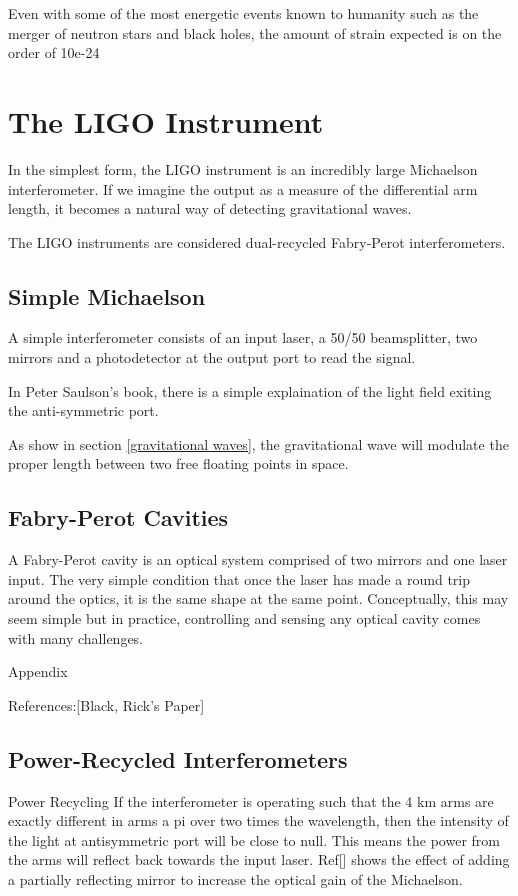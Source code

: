 \documentclass[oneside]{book}
\begin{document}
	Even with some of the most energetic events known to humanity such as the merger of neutron stars and black holes, the amount of strain expected is on the order of 10e-24
	
	\cite{Saulson}
	
	
	\section{The LIGO Instrument}
	In the simplest form, the LIGO instrument is an incredibly large Michaelson interferometer.  If we imagine the output as a measure of the differential arm length, it becomes a natural way of detecting gravitational waves.
	
	The LIGO instruments are considered dual-recycled Fabry-Perot interferometers.
	
		\subsection{Simple Michaelson}
		A simple interferometer consists of an input laser, a 50/50 beamsplitter, two mirrors and a photodetector at the output port to read the signal.
		
		In Peter Saulson's book, there is a simple explaination of the light field exiting the anti-symmetric port.
		
		
		As show in section \ref{gravitational waves}, the gravitational wave will modulate the proper length between two free floating points in space. 
	
		\subsection{Fabry-Perot Cavities}\label{FP}
		A Fabry-Perot cavity is an optical system comprised of two mirrors and one laser input. The very simple condition that once the laser has made a round trip around the optics, it is the same shape at the same point.  Conceptually, this may seem simple but in practice, controlling and sensing any optical cavity comes with many challenges.

		Appendix

		References:[Black, Rick's Paper]

		\subsection{Power-Recycled Interferometers}
		Power Recycling
		If the interferometer is operating such that the 4 km arms are exactly different in arms a pi over two times the wavelength, then the intensity of the light at antisymmetric port will be close to null.  This means the power from the arms will reflect back towards the input laser.  Ref[] shows the effect of adding a partially reflecting mirror to increase the optical gain of the Michaelson.
		
\end{document}
